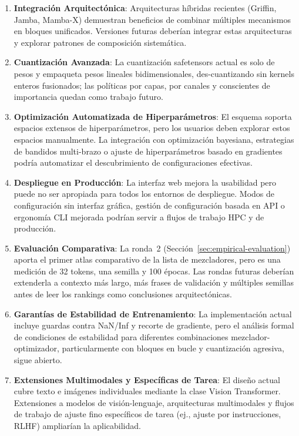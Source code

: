 \begin{enumerate}[leftmargin=*]
    \item \textbf{Integración Arquitectónica}: Arquitecturas híbridas recientes (Griffin, Jamba, Mamba-X) demuestran beneficios de combinar múltiples mecanismos en bloques unificados. Versiones futuras deberían integrar estas arquitecturas y explorar patrones de composición sistemática.
    
    \item \textbf{Cuantización Avanzada}: La cuantización safetensors actual es solo de pesos y empaqueta pesos lineales bidimensionales, des-cuantizando sin kernels enteros fusionados; las políticas por capas, por canales y conscientes de importancia quedan como trabajo futuro.
    
    \item \textbf{Optimización Automatizada de Hiperparámetros}: El esquema soporta espacios extensos de hiperparámetros, pero los usuarios deben explorar estos espacios manualmente. La integración con optimización bayesiana, estrategias de bandidos multi-brazo o ajuste de hiperparámetros basado en gradientes podría automatizar el descubrimiento de configuraciones efectivas.
    
    \item \textbf{Despliegue en Producción}: La interfaz web mejora la usabilidad pero puede no ser apropiada para todos los entornos de despliegue. Modos de configuración sin interfaz gráfica, gestión de configuración basada en API o ergonomía CLI mejorada podrían servir a flujos de trabajo HPC y de producción.
    
    \item \textbf{Evaluación Comparativa}: La ronda~2 (Sección~\ref{sec:empirical-evaluation}) aporta el primer atlas comparativo de la lista de mezcladores, pero es una medición de 32 tokens, una semilla y 100 épocas. Las rondas futuras deberían extenderla a contexto más largo, más frases de validación y múltiples semillas antes de leer los rankings como conclusiones arquitectónicas.
    
    \item \textbf{Garantías de Estabilidad de Entrenamiento}: La implementación actual incluye guardas contra NaN/Inf y recorte de gradiente, pero el análisis formal de condiciones de estabilidad para diferentes combinaciones mezclador-optimizador, particularmente con bloques en bucle y cuantización agresiva, sigue abierto.
    
    \item \textbf{Extensiones Multimodales y Específicas de Tarea}: El diseño actual cubre texto e imágenes individuales mediante la clase Vision Transformer. Extensiones a modelos de visión-lenguaje, arquitecturas multimodales y flujos de trabajo de ajuste fino específicos de tarea (ej., ajuste por instrucciones, RLHF) ampliarían la aplicabilidad.
\end{enumerate}

